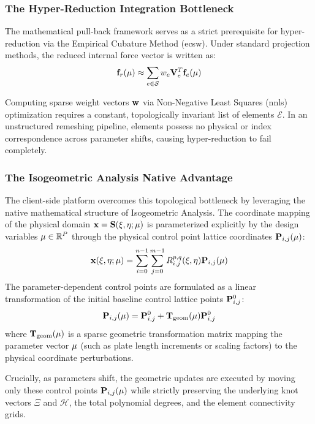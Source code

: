 \subsubsection{The Hyper-Reduction Integration Bottleneck}
The mathematical pull-back framework serves as a strict prerequisite for hyper-reduction via the Empirical Cubature Method (\acrshort{ecsw}). Under standard projection methods, the reduced internal force vector is written as:
\begin{equation}
    \mathbf{f}_r(\mathbf{\mu}) \approx \sum_{e \in \mathcal{S}} w_e \mathbf{V}_e^T \mathbf{f}_e(\mathbf{\mu})
\end{equation}

Computing sparse weight vectors $\mathbf{w}$ via Non-Negative Least Squares (\acrshort{nnls}) optimization requires a constant, topologically invariant list of elements $\mathcal{E}$. In an unstructured remeshing pipeline, elements possess no physical or index correspondence across parameter shifts, causing hyper-reduction to fail completely.

\subsubsection{The Isogeometric Analysis Native Advantage}
The client-side platform overcomes this topological bottleneck by leveraging the native mathematical structure of Isogeometric Analysis. The coordinate mapping of the physical domain $\mathbf{x} = \mathbf{S}(\xi, \eta; \mathbf{\mu})$ is parameterized explicitly by the design variables $\mathbf{\mu} \in \mathbb{R}^P$ through the physical control point lattice coordinates $\mathbf{P}_{i,j}(\mathbf{\mu})$:
\begin{equation}
        \mathbf{x}(\xi, \eta; \mathbf{\mu}) = \sum_{i=0}^{n-1} \sum_{j=0}^{m-1} R_{i,j}^{p,q}(\xi, \eta) \mathbf{P}_{i,j}(\mathbf{\mu})
\end{equation}
The parameter-dependent control points are formulated as a linear transformation of the initial baseline control lattice points $\mathbf{P}_{i,j}^0$:
\begin{equation}
        \mathbf{P}_{i,j}(\mathbf{\mu}) = \mathbf{P}_{i,j}^0 + \mathbf{T}_{\text{geom}}(\mathbf{\mu}) \mathbf{P}_{i,j}^0
\end{equation}
where $\mathbf{T}_{\text{geom}}(\mathbf{\mu})$ is a sparse geometric transformation matrix mapping the parameter vector $\mathbf{\mu}$ (such as plate length increments or scaling factors) to the physical coordinate perturbations.

Crucially, as parameters shift, the geometric updates are executed by moving only these control points $\mathbf{P}_{i,j}(\mathbf{\mu})$ while strictly preserving the underlying knot vectors $\Xi$ and $\mathcal{H}$, the total polynomial degrees, and the element connectivity grids.

